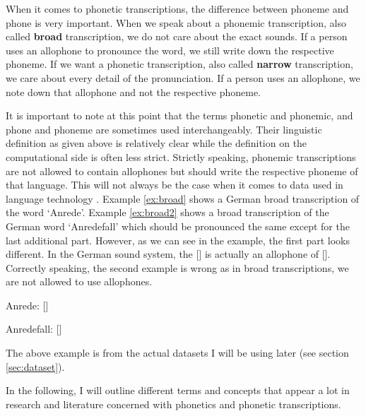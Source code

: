 When it comes to phonetic transcriptions, the difference between phoneme and phone is very important. When we speak about a phonemic transcription, also called \textbf{broad} transcription, we do not care about the exact sounds. If a person uses an allophone to pronounce the word, we still write down the respective phoneme. If we want a phonetic transcription, also called \textbf{narrow} transcription, we care about every detail of the pronunciation. If a person uses an allophone, we note down that allophone and not the respective phoneme. 

It is important to note at this point that the terms phonetic and phonemic, and phone and phoneme are sometimes used interchangeably. Their linguistic definition as given above is relatively clear while the definition on the computational side is often less strict. Strictly speaking, phonemic transcriptions are not allowed to contain allophones but should write the respective phoneme of that language. This will not always be the case when it comes to data used in language technology \citep{Lee&Ashby.2020}. Example \ref{ex:broad} shows a German broad transcription of the word `Anrede'. Example \ref{ex:broad2} shows a broad transcription of the German word `Anredefall' which should be pronounced the same except for the last additional part. However, as we can see in the example, the first part looks different. In the German sound system, the [] is actually an allophone of []. Correctly speaking, the second example is wrong as in broad transcriptions, we are not allowed to use allophones. 

\begin{covexamples}
\item \label{ex:broad} Anrede: [] %
\item \label{ex:broad2} Anredefall: [] %
\end{covexamples}

The above example is from the actual datasets I will be using later (see section \ref{sec:dataset}). 

In the following, I will outline different terms and concepts that appear a lot in research and literature concerned with phonetics and phonetic transcriptions.

